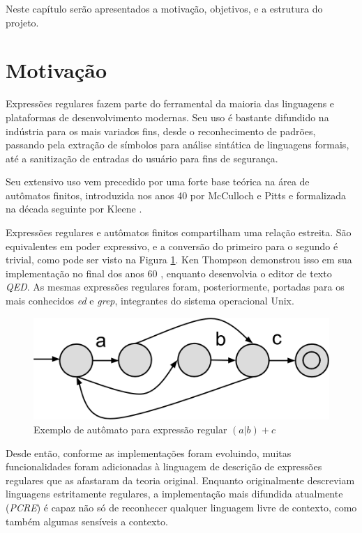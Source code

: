 \documentclass[a4paper,12pt,oneside,onecolumn]{uerj}
\begin{document}
Neste capítulo serão apresentados a motivação, objetivos, e a estrutura do projeto.

\section{Motivação}

Expressões regulares fazem parte do ferramental da maioria das linguagens e plataformas de desenvolvimento modernas. Seu uso é bastante difundido na indústria para os mais variados fins, desde o reconhecimento de padrões, passando pela extração de símbolos para análise sintática de linguagens formais, até a sanitização de entradas do usuário para fins de segurança.

Seu extensivo uso vem precedido por uma forte base teórica na área de autômatos finitos, introduzida nos anos 40 por McCulloch e Pitts \cite{bib:McCulloch43} e formalizada na década seguinte por Kleene \cite{bib:Kleene56}.

Expressões regulares e autômatos finitos compartilham uma relação estreita. São equivalentes em poder expressivo, e a conversão do primeiro para o segundo é trivial, como pode ser visto na Figura \ref{fig:exemplo_automato}. Ken Thompson demonstrou isso em sua implementação no final dos anos 60 \cite{bib:Thompson68}, enquanto desenvolvia o editor de texto \emph{QED}. As mesmas expressões regulares foram, posteriormente, portadas para os mais conhecidos \emph{ed} e \emph{grep}, integrantes do sistema operacional Unix.

\begin{figure}[ht]
  \centering
  \includegraphics[scale=0.3]{figures/exemplo_automato.png}
  \caption{Exemplo de autômato para expressão regular $(a|b)+c$}
  \label{fig:exemplo_automato}
\end{figure}

Desde então, conforme as implementações foram evoluindo, muitas funcionalidades foram adicionadas à linguagem de descrição de expressões regulares que as afastaram da teoria original. Enquanto originalmente descreviam linguagens estritamente regulares, a implementação mais difundida atualmente (\emph{PCRE}) é capaz não só de reconhecer qualquer linguagem livre de contexto, como também algumas sensíveis a contexto. \cite{bib:Nikita12}
\end{document}
